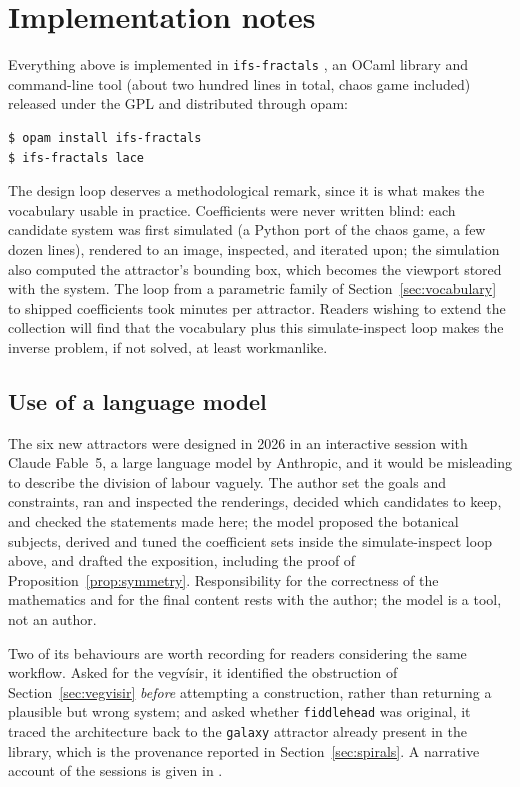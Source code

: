 \documentclass[11pt,a4paper]{article}
\theoremstyle{remark}
\begin{document}
\section{Implementation notes}
\label{sec:implementation}

Everything above is implemented in \texttt{ifs-fractals}
\cite{ifsfractals2026}, an OCaml library and command-line tool (about two
hundred lines in total, chaos game included) released under the GPL and
distributed through opam:

\begin{lstlisting}
$ opam install ifs-fractals
$ ifs-fractals lace
\end{lstlisting}

\noindent
The design loop deserves a methodological remark, since it is what makes the
vocabulary usable in practice. Coefficients were never written blind: each
candidate system was first simulated (a Python port of the chaos game, a few
dozen lines), rendered to an image, inspected, and iterated upon; the
simulation also computed the attractor's bounding box, which becomes the
viewport stored with the system. The loop from a parametric family of
Section~\ref{sec:vocabulary} to shipped coefficients took minutes per
attractor. Readers wishing to extend the collection will find that the
vocabulary plus this simulate-inspect loop makes the inverse problem, if not
solved, at least workmanlike.

\subsection*{Use of a language model}

The six new attractors were designed in 2026 in an interactive session with
Claude Fable~5, a large language model by Anthropic, and it would be
misleading to describe the division of labour vaguely. The author set the
goals and constraints, ran and inspected the renderings, decided which
candidates to keep, and checked the statements made here; the model proposed
the botanical subjects, derived and tuned the coefficient sets inside the
simulate-inspect loop above, and drafted the exposition, including the proof
of Proposition~\ref{prop:symmetry}. Responsibility for the correctness of the
mathematics and for the final content rests with the author; the model is a
tool, not an author.

Two of its behaviours are worth recording for readers considering the same
workflow. Asked for the vegvísir, it identified the obstruction of
Section~\ref{sec:vegvisir} \emph{before} attempting a construction, rather
than returning a plausible but wrong system; and asked whether
\texttt{fiddlehead} was original, it traced the architecture back to the
\texttt{galaxy} attractor already present in the library, which is the
provenance reported in Section~\ref{sec:spirals}. A narrative account of the
sessions is given in \cite{bonhomme2026blog}.
\end{document}
